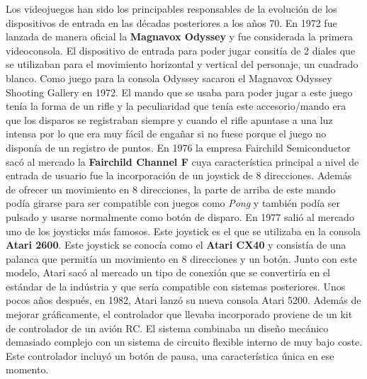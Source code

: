 Los videojuegos han sido los principables responsables de la evoluci\'on de los dispositivos de entrada en las d\'ecadas posteriores a los a\~nos 70. En 1972 fue lanzada de manera oficial la \textbf{Magnavox Odyssey} y fue considerada la primera videoconsola. El dispositivo de entrada para poder jugar consit\'ia de 2 diales que se utilizaban para el movimiento horizontal y vertical del personaje, un cuadrado blanco. Como juego para la consola Odyssey sacaron el Magnavox Odyssey Shooting Gallery en 1972. El mando que se usaba para poder jugar a este juego tenía la forma de un rifle y la peculiaridad que tenía este accesorio/mando era que los disparos se registraban siempre y cuando el rifle apuntase a una luz intensa por lo que era muy f\'acil de enga\~nar si no fuese porque el juego no dispon\'ia de un registro de puntos. En 1976 la empresa Fairchild Semiconductor sac\'o al mercado la \textbf{Fairchild Channel F} cuya caracter\'istica principal a nivel de entrada de usuario fue la incorporaci\'on de un joystick de 8 direcciones.  Adem\'as de ofrecer un movimiento en 8 direcciones, la parte de arriba de este mando pod\'ia girarse para ser compatible con juegos como \textit{Pong} y tambi\'en pod\'ia ser pulsado y usarse normalmente como bot\'on de disparo. En 1977 sali\'o al mercado uno de los joysticks m\'as famosos. Este joystick es el que se utilizaba en la consola \textbf{Atari 2600}. Este joystick se conoc\'ia como el \textbf{Atari CX40} y consist\'ia de una palanca que permit\'ia un movimiento en 8 direcciones y un bot\'on. Junto con este modelo, Atari sac\'o al mercado un tipo de conexi\'on que se convertir\'ia en el est\'andar de la ind\'ustria y que ser\'ia compatible con sistemas posteriores. Unos pocos a\~nos despu\'es, en 1982, Atari lanz\'o su nueva consola Atari 5200. Adem\'as de mejorar gr\'aficamente, el controlador que llevaba incorporado proviene de un kit de controlador de un avi\'on RC. El sistema combinaba un dise\~no mec\'anico demasiado complejo con un sistema de circuito flexible interno de muy bajo coste. Este controlador incluy\'o un bot\'on de pausa, una caracter\'istica \'unica en ese momento.\par

